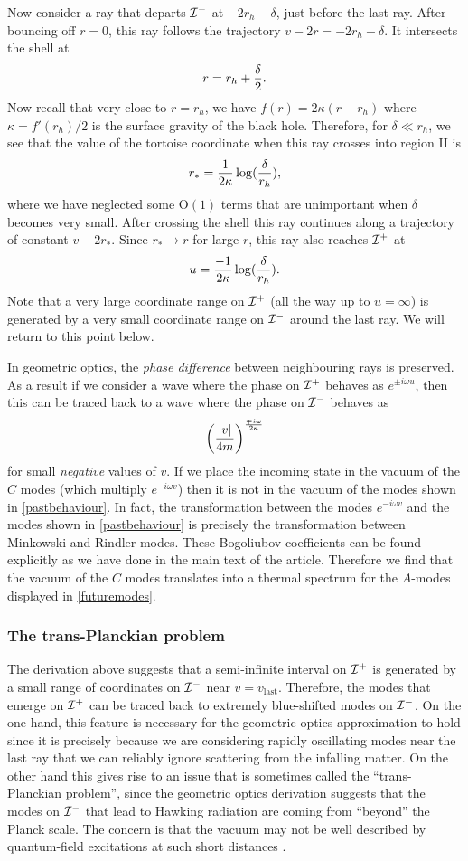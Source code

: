 \documentclass[12pt]{article}
\def\Or[#1]{{\text{O}}\left({#1}\right)}
\def\rtor{{r_*}}
\newcommand{\be}{\begin{equation}}
\newcommand{\ee}{\end{equation}}
\def \scrip{{\cal I}^{+}}
\def \scrim{{\cal I}^{-}}
\begin{document}
Now consider a ray that departs $\scrim$ at $-2 r_h - \delta$, just before the last ray. After bouncing off $r = 0$, this ray follows the trajectory $v - 2 r = -2 r_h - \delta$. It intersects the shell at
\be
r = r_h + {\delta \over 2}.
\ee
Now recall that very close to $r = r_h$, we have $f(r) = 2 \kappa (r - r_h)$ where $\kappa = f'(r_h)/2$ is the surface gravity of the black hole. Therefore, for $\delta \ll r_h$, we see that the value of the tortoise coordinate when this ray crosses into region II is
\be
\rtor = {1 \over 2 \kappa} \log({\delta \over r_h}),
\ee
where we have neglected some $\Or[1]$ terms that are unimportant when $\delta$ becomes very small. After crossing the shell this ray continues along a trajectory of constant $v - 2 \rtor$. Since $\rtor \rightarrow r$ for large $r$, this ray also reaches $\scrip$ at
\be
u = {-1 \over 2 \kappa} \log({\delta \over r_h}).
\ee
Note that a very large coordinate range on ${\cal I}^+$ (all the way up to $u = \infty$) is generated by a very small coordinate range on ${\cal I}^{-}$ around the last ray. We will return to this point below.

In geometric optics, the {\em phase difference} between neighbouring rays is preserved. As a result if we consider a wave where the phase on ${\cal I}^+$ behaves as $e^{\pm i \omega u}$, then this can be traced back to a wave where the phase on ${\cal I}^{-}$ behaves as
\be
\label{pastbehaviour}
\left({|v| \over  4 m}\right)^{\mp  i \omega \over 2 \kappa}
\ee
 for small {\em negative} values of  $v$. If we place the incoming state in the vacuum of the $C$ modes (which multiply $e^{-i \omega v}$) then it is not in the vacuum of the modes shown in \eqref{pastbehaviour}. In fact, the transformation between the modes $e^{-i \omega v}$ and the modes shown in \eqref{pastbehaviour} is precisely the transformation between Minkowski and Rindler modes. These Bogoliubov coefficients can be found explicitly as we have done in the main text of the article. Therefore we find that the vacuum of the $C$ modes translates into a thermal spectrum for the $A$-modes displayed in \eqref{futuremodes}.

\subsubsection*{The trans-Planckian problem }
The derivation above suggests that a semi-infinite interval on $\scrip$ is generated by a small range of coordinates on $\scrim$ near $v = v_{\text{last}}$. Therefore, the modes that emerge on $\scrip$ can be traced back to extremely blue-shifted modes on $\scrim$.  On the one hand, this feature is necessary for the geometric-optics approximation to hold since it is precisely because we are considering rapidly oscillating modes near the last ray that we can reliably ignore
scattering from the infalling matter. On the other hand this gives rise to an issue that is sometimes called the ``trans-Planckian problem'', since the geometric optics derivation suggests that the modes on $\scrim$ that lead to Hawking radiation are coming from ``beyond'' the Planck scale. The concern is that the vacuum may not be well described by quantum-field excitations at such short distances \cite{tHooft:1996rdg}.
\end{document}
